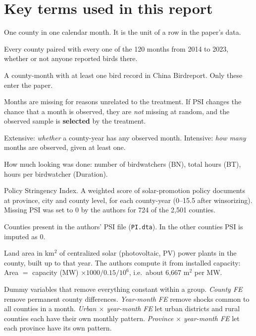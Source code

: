 \documentclass[11pt]{article}
\newcommand{\term}[1]{\textbf{#1}}
\begin{document}
\section{Key terms used in this report}
\begin{termbox}
\begin{description}[leftmargin=0pt,itemsep=2pt,font=\normalfont\bfseries]
\item[County-month.] One county in one calendar month. It is the unit of a row in the paper's data.
\item[Possible (or ``full'') grid.] Every county paired with every one of the 120 months from 2014 to 2023, whether or not anyone reported birds there.
\item[Observed county-month.] A county-month with at least one bird record in China Birdreport. Only these enter the paper.
\item[Missing at random.] Months are missing for reasons unrelated to the treatment. If PSI changes the chance that a month is observed, they are \emph{not} missing at random, and the observed sample is \term{selected} by the treatment.
\item[Extensive / intensive margin.] Extensive: \emph{whether} a county-year has any observed month. Intensive: \emph{how many} months are observed, given at least one.
\item[Birdwatching effort.] How much looking was done: number of birdwatchers (BN), total hours (BT), hours per birdwatcher (Duration).
\item[PSI.] Policy Stringency Index. A weighted score of solar-promotion policy documents at province, city and county level, for each county-year (0--15.5 after winsorizing). Missing PSI was set to 0 by the authors for 724 of the 2,501 counties.
\item[Real-PSI counties.] Counties present in the authors' PSI file (\texttt{PI.dta}). In the other counties PSI is imputed as 0.
\item[Area (solar-plant area).] Land area in km$^2$ of centralized solar (photovoltaic, PV) power plants in the county, built up to that year. The authors compute it from installed capacity: Area $=$ capacity (MW) $\times 1000 / 0.15 / 10^6$, i.e.\ about 6,667 m$^2$ per MW.
\item[Fixed effects (FE).] Dummy variables that remove everything constant within a group. \emph{County FE} remove permanent county differences. \emph{Year-month FE} remove shocks common to all counties in a month. \emph{Urban $\times$ year-month FE} let urban districts and rural counties each have their own monthly pattern. \emph{Province $\times$ year-month FE} let each province have its own pattern.

\end{description}
\end{termbox}
\end{document}
